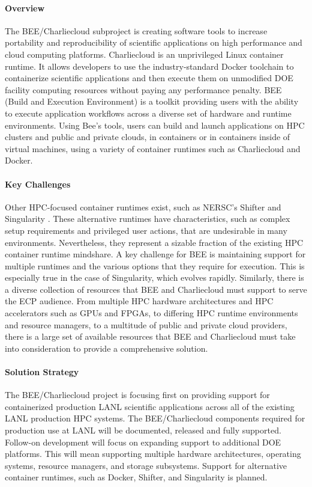 \paragraph{Overview}
The BEE/Charliecloud subproject is creating software tools to increase portability
and reproducibility of scientific applications on high performance and cloud
computing platforms.  Charliecloud \cite{priedhorskyrrandlestc2016} is an unprivileged Linux container
runtime.  It allows developers to use the industry-standard Docker
\cite{dockerinc}
toolchain to containerize scientific applications and then execute them on
unmodified DOE facility computing resources without paying any performance
penalty.  BEE \cite{beeproject} (Build and Execution Environment) is a toolkit providing
users with the ability to execute application workflows across a diverse set of
hardware and runtime environments.  Using Bee's tools, users can build and
launch applications on HPC clusters and public and private clouds, in
containers or in containers inside of virtual machines, using a variety of
container runtimes such as Charliecloud and Docker. 

\paragraph{Key Challenges}
Other HPC-focused container runtimes exist, such as NERSC's Shifter
\cite{canonrsjacobsend} and
Singularity \cite{kurtzergmsochatvbauermw}.  These alternative runtimes have characteristics, such as
complex setup requirements and privileged user actions, that are undesirable in
many environments.  Nevertheless, they represent a sizable fraction of the
existing HPC container runtime mindshare.  A key challenge for BEE is
maintaining support for multiple runtimes and the various options that they require
for execution.  This is especially true in the case of Singularity, which
evolves rapidly.  Similarly, there is a diverse collection of resources that
BEE and Charliecloud must support to serve the ECP audience.  From multiple HPC
hardware architectures and HPC accelerators such as GPUs and FPGAs, to
differing HPC runtime environments and resource managers, to a multitude of
public and private cloud providers, there is a large set of available resources
that BEE and Charliecloud must take into consideration to provide a
comprehensive solution.

\paragraph{Solution Strategy}
The BEE/Charliecloud project is focusing first on providing support for
containerized production LANL scientific applications across all of the
existing LANL production HPC systems.  The BEE/Charliecloud components required
for production use at LANL will be documented, released and fully supported.
Follow-on development will focus on expanding support to additional DOE
platforms.  This will mean supporting multiple hardware architectures,
operating systems, resource managers, and storage subsystems.  Support for
alternative container runtimes, such as Docker, Shifter, and Singularity is
planned.


